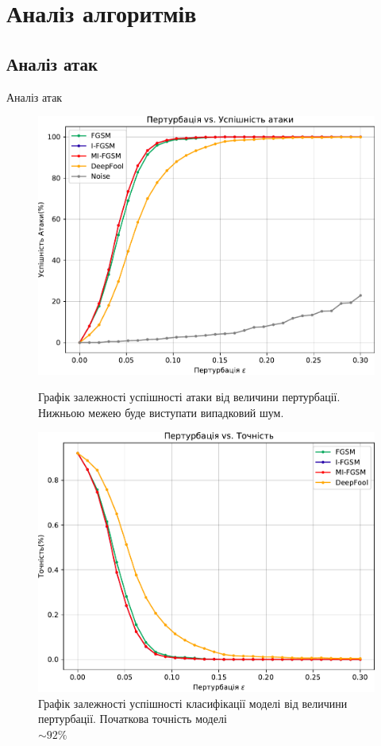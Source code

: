 \documentclass[aspectratio=169]{beamer}
\begin{document}
			
	\section{Аналіз алгоритмів}
	
	\subsection{Аналіз атак}
	\begin{frame}{Аналіз атак}
		\begin{figure}[!htb]
			\includegraphics[width=1\textwidth]{../CourseWorkLatex/resources/attacks_bench_8_6.pdf}
			\caption{Графік залежності успішності атаки від величини пертурбації. Нижньою межею буде виступати випадковий шум. }
			\label{fig:attacks_bench}
			\endminipage\hfill
			\includegraphics[width=1\textwidth]{../CourseWorkLatex/resources/defenses_bench_8_6.pdf}
			\caption{Графік залежності успішності класифікації моделі від величини пертурбації. Початкова точність моделі \\ $\sim 92\%$}
			\label{fig:defenses_bench}
			\endminipage
		\end{figure}	
	\end{frame}
\end{document}
